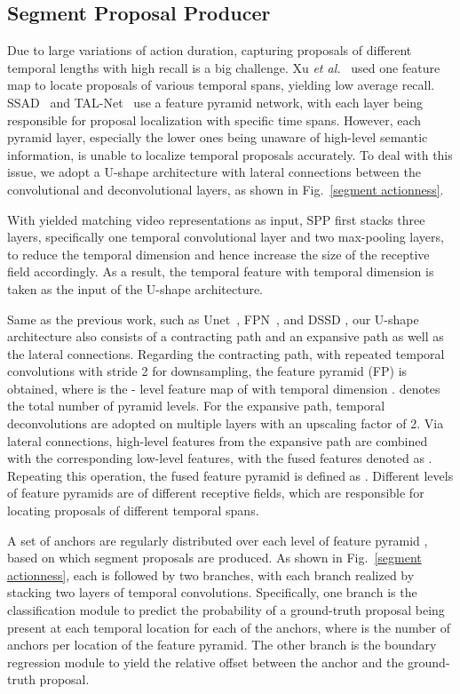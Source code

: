 \documentclass[10pt,twocolumn,letterpaper]{article}
\begin{document}
\subsection{Segment Proposal Producer}
\label{section3.3}

Due to large variations of action duration, capturing proposals of different temporal lengths with high recall is a big challenge. Xu \textit{et al.}~\cite{r-c3d} used one feature map to locate proposals of various temporal spans, yielding low average recall. SSAD~\cite{ssad} and TAL-Net~\cite{re_faster} use a feature pyramid network, with each layer being responsible for proposal localization with specific time spans. However, each pyramid layer, especially the lower ones being unaware of high-level semantic information, is unable to localize  temporal proposals accurately. To deal with this issue, we adopt a U-shape architecture with lateral connections between the convolutional and deconvolutional layers, as shown in Fig.~\ref{segment actionness}.

With yielded matching video representations  as input, SPP first stacks three layers, specifically one temporal convolutional layer and two max-pooling layers, to reduce the temporal dimension and hence increase the size of the receptive field accordingly. As a result, the temporal feature  with temporal dimension  is taken as the input of the U-shape architecture.

Same as the previous work, such as Unet~\cite{unet}, FPN~\cite{fpn}, and DSSD \cite{dssd}, our U-shape architecture also consists of a contracting path and an expansive path as well as the lateral connections. Regarding the contracting path, with repeated temporal convolutions with stride 2 for downsampling, the feature pyramid (FP)  is obtained, where  is the - level  feature map of  with  temporal dimension .  denotes the total number of pyramid levels.
For the expansive path, temporal deconvolutions are adopted on multiple layers with an upscaling factor of 2. Via lateral connections, high-level
features from the expansive path are combined with the corresponding low-level features, with the fused features denoted as . Repeating this operation, the fused feature pyramid is defined as .  Different levels of feature pyramids are of different receptive fields, which are responsible for locating proposals of different temporal spans. 

 A set of anchors are regularly distributed over each level of feature pyramid , based on which segment proposals are produced.  As shown in Fig.~\ref{segment actionness}, each  is followed by two branches, with each branch realized by stacking two layers of temporal convolutions. Specifically, one branch is the classification module to predict the probability of a ground-truth proposal being present at each temporal location for each of the  anchors, where  is the number of anchors per location of the feature pyramid. The other branch is the boundary regression module to yield the relative offset between the anchor and the ground-truth proposal.
\end{document}

